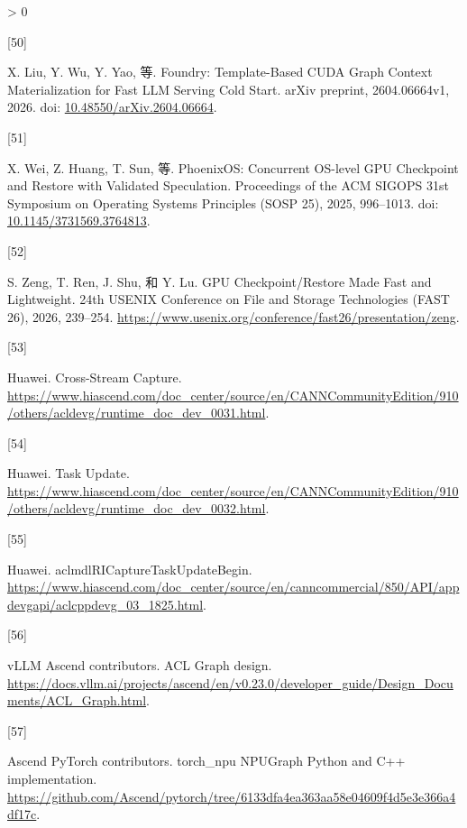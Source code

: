 \documentclass[
  UTF8,
  zihao=5]{ctexart}
\newlength{\cslhangindent}
\newlength{\csllabelwidth}
\newenvironment{CSLReferences}[2] %
 {%
  \setlength{\parindent}{0pt}
  \ifodd #1 \everypar{\setlength{\hangindent}{\cslhangindent}}\ignorespaces\fi
  \ifnum #2 > 0
  \setlength{\parskip}{#2\baselineskip}
  \fi
 }%
 {}
\newcommand{\CSLLeftMargin}[1]{\parbox[t]{\csllabelwidth}{#1}}
\newcommand{\CSLRightInline}[1]{\parbox[t]{\linewidth - \csllabelwidth}{#1}\par}
\begin{document}
\begin{CSLReferences}{0}{0}
\leavevmode{}%
\CSLLeftMargin{{[}50{]} }%
\CSLRightInline{X. Liu, Y. Wu, Y. Yao, 等. Foundry: Template-Based CUDA
Graph Context Materialization for Fast LLM Serving Cold Start. arXiv
preprint, 2604.06664v1, 2026. doi:
\href{https://doi.org/10.48550/arXiv.2604.06664}{10.48550/arXiv.2604.06664}.}

\leavevmode{}%
\CSLLeftMargin{{[}51{]} }%
\CSLRightInline{X. Wei, Z. Huang, T. Sun, 等. PhoenixOS: Concurrent
OS-level GPU Checkpoint and Restore with Validated Speculation.
Proceedings of the ACM SIGOPS 31st Symposium on Operating Systems
Principles (SOSP 25), 2025, 996--1013. doi:
\href{https://doi.org/10.1145/3731569.3764813}{10.1145/3731569.3764813}.}

\leavevmode{}%
\CSLLeftMargin{{[}52{]} }%
\CSLRightInline{S. Zeng, T. Ren, J. Shu, 和 Y. Lu. GPU
Checkpoint/Restore Made Fast and Lightweight. 24th USENIX Conference on
File and Storage Technologies (FAST 26), 2026, 239--254.
\url{https://www.usenix.org/conference/fast26/presentation/zeng}.}

\leavevmode{}%
\CSLLeftMargin{{[}53{]} }%
\CSLRightInline{Huawei. {Cross-Stream Capture}.
\url{https://www.hiascend.com/doc_center/source/en/CANNCommunityEdition/910/others/acldevg/runtime_doc_dev_0031.html}.}

\leavevmode{}%
\CSLLeftMargin{{[}54{]} }%
\CSLRightInline{Huawei. {Task Update}.
\url{https://www.hiascend.com/doc_center/source/en/CANNCommunityEdition/910/others/acldevg/runtime_doc_dev_0032.html}.}

\leavevmode{}%
\CSLLeftMargin{{[}55{]} }%
\CSLRightInline{Huawei. {aclmdlRICaptureTaskUpdateBegin}.
\url{https://www.hiascend.com/doc_center/source/en/canncommercial/850/API/appdevgapi/aclcppdevg_03_1825.html}.}

\leavevmode{}%
\CSLLeftMargin{{[}56{]} }%
\CSLRightInline{vLLM Ascend contributors. {ACL Graph design}.
\url{https://docs.vllm.ai/projects/ascend/en/v0.23.0/developer_guide/Design_Documents/ACL_Graph.html}.}

\leavevmode{}%
\CSLLeftMargin{{[}57{]} }%
\CSLRightInline{Ascend PyTorch contributors. {torch\_npu NPUGraph Python
and C++ implementation}.
\url{https://github.com/Ascend/pytorch/tree/6133dfa4ea363aa58e04609f4d5e3e366a4df17c}.}


\end{CSLReferences}
\end{document}
